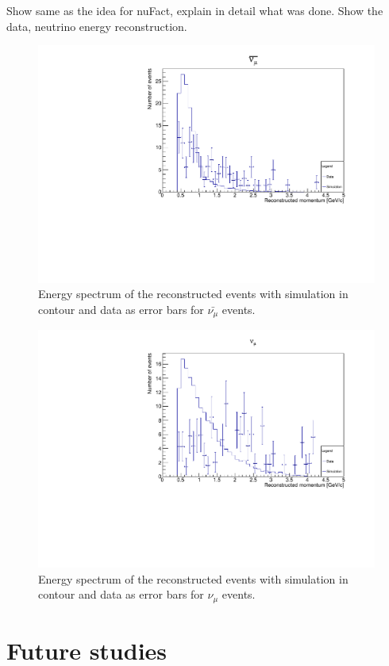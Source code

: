 Show same as the idea for nuFact, explain in detail what was done. Show the data, neutrino energy reconstruction.


\begin{figure}[h!]
\centering
\includegraphics[width=.9\textwidth]{figures/NeutrinoChap/nuBarEvent.pdf}
\caption{Energy spectrum of the reconstructed events with simulation in contour and data as error bars for $\bar{\nu_\mu}$ events.}
\label{fig:datanumubar}
\end{figure}

\begin{figure}[h!]
\centering
\includegraphics[width=.9\textwidth]{figures/NeutrinoChap/nuEvent.pdf}
\caption{Energy spectrum of the reconstructed events with simulation in contour and data as error bars for $\nu_\mu$ events.}
\label{fig:datanumu}
\end{figure}



\pagebreak
\section{Future studies}

